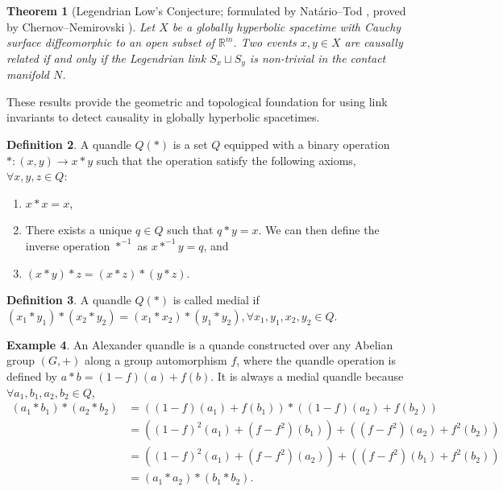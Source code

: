 \documentclass[12pt, letterpaper]{article}
\theoremstyle{plain}
\newtheorem{theorem}{Theorem}[section]
\theoremstyle{definition}
\newtheorem{definition}[theorem]{Definition}
\newtheorem{example}[theorem]{Example}
\begin{document}
\begin{theorem}[Legendrian Low's Conjecture; formulated by Nat\'ario--Tod \cite{NT}, proved by Chernov--Nemirovski \cite{CN}]
Let \(X\) be a globally hyperbolic spacetime with Cauchy surface diffeomorphic to an open subset of \(\mathbb{R}^m\). Two events \(x, y \in X\) are causally related if and only if the Legendrian link \(S_x \sqcup S_y\) is non-trivial in the contact manifold \(N\).
\end{theorem}

These results provide the geometric and topological foundation for using link invariants to detect causality in globally hyperbolic spacetimes.
 
 
 
 
 \begin{definition}

 A quandle $Q(*)$ is a set $Q$ equipped with a binary operation $*: (x,y)\to x*y$ such that the operation satisfy the following axioms, $\forall x, y, z\in Q:$
  \begin{enumerate}
    \item  $x*x=x$, 
    \item  There exists a unique $q\in Q$ such that $q*y=x$. We can then define the inverse operation $*^{-1}$ as $x*^{-1}y=q$, and 
    \item  $(x*y)*z=(x*z)*(y*z)$. \\ 
\end{enumerate}
\end{definition}

\begin{definition}
    A quandle $Q(*)$ is called medial if $(x_1*y_1)*(x_2*y_2)=(x_1*x_2)*(y_1*y_2), \forall x_1,y_1,x_2,y_2\in Q$. \\ \end{definition} 

    \begin{example} \label{DofAlexan}
    An Alexander quandle is a quande constructed over any Abelian group $(G,+)$ along a group automorphism $f$, where the quandle operation is defined by $a*b=(1-f)(a)+f(b)$. It is always a medial quandle because $\forall a_1,b_1,a_2,b_2\in Q$,
    \begin{equation*}
\begin{split}
(a_1*b_1)*(a_2*b_2) & = ((1-f)(a_1)+f(b_1))*((1-f)(a_2)+f(b_2)) \\
 & = ((1-f)^2(a_1)+(f-f^2)(b_1))+((f-f^2)(a_2)+f^2(b_2)) \\ 
 & =((1-f)^2(a_1)+(f-f^2)(a_2))+((f-f^2)(b_1)+f^2(b_2)) \\
 & = (a_1*a_2)*(b_1*b_2).
\end{split}
\end{equation*}
    
    \end{example}
\end{document}
